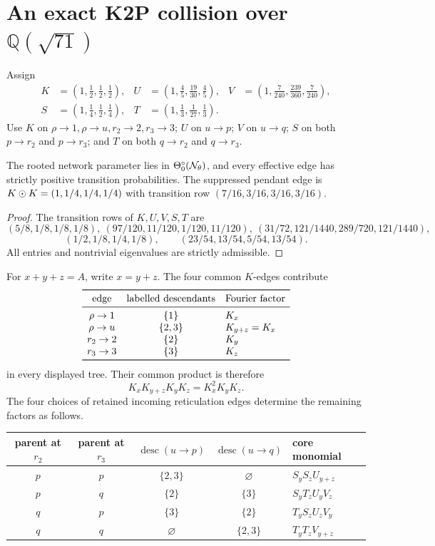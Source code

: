 \documentclass[11pt]{article}
\theoremstyle{remark}\newtheorem{remark}[theorem]{Remark}
\begin{document}
\section{An exact K2P collision over \texorpdfstring{$\mathbb Q(\sqrt{71})$}{Q(sqrt(71))}}\label{sec:k2p-simple}
Assign
\begin{equation}\label{eq:k2p-vectors}
\begin{aligned}
K&=(1,\tfrac12,\tfrac12,\tfrac12),&U&=(1,\tfrac45,\tfrac{19}{30},\tfrac45),&V&=(1,\tfrac7{240},\tfrac{239}{360},\tfrac7{240}),\\
S&=(1,\tfrac14,\tfrac12,\tfrac14),&T&=(1,\tfrac13,\tfrac1{27},\tfrac13).
\end{aligned}
\end{equation}
Use $K$ on $\rho\to1,\rho\to u,r_2\to2,r_3\to3$; $U$ on $u\to p$; $V$ on $u\to q$; $S$ on both $p\to r_2$ and $p\to r_3$; and $T$ on both $q\to r_2$ and $q\to r_3$.
\begin{lemma}\label{lem:k2p-adm}
The rooted network parameter lies in $\Theta_0^\circ(\mathcal N_\theta)$, and every effective edge has strictly positive transition probabilities. The suppressed pendant edge is $K\mathbin{\odot} K=(1,1/4,1/4,1/4)$ with transition row $(7/16,3/16,3/16,3/16)$.
\end{lemma}
\begin{proof}
The transition rows of $K,U,V,S,T$ are
\[
(5/8,1/8,1/8,1/8),\ (97/120,11/120,1/120,11/120),\ (31/72,121/1440,289/720,121/1440),
\]
\[
(1/2,1/8,1/4,1/8),\qquad(23/54,13/54,5/54,13/54).
\]
All entries and nontrivial eigenvalues are strictly admissible.
\end{proof}
For $x+y+z=A$, write $x=y+z$. The four common $K$-edges contribute
\[
\begin{array}{ccl}
\toprule
\text{edge}&\text{labelled descendants}&\text{Fourier factor}\\
\midrule
\rho\to1&\{1\}&K_x\\
\rho\to u&\{2,3\}&K_{y+z}=K_x\\
r_2\to2&\{2\}&K_y\\
r_3\to3&\{3\}&K_z\\
\bottomrule
\end{array}
\]
in every displayed tree. Their common product is therefore
\[
K_xK_{y+z}K_yK_z=K_x^2K_yK_z.
\]
The four choices of retained incoming reticulation edges determine the remaining factors as follows.
\begin{center}
\small
\begin{tabularx}{\textwidth}{@{}cccc>{\raggedright\arraybackslash}X@{}}
\toprule
\shortstack{parent\\at $r_2$}&\shortstack{parent\\at $r_3$}&$\operatorname{desc}(u\to p)$&$\operatorname{desc}(u\to q)$&core monomial\\
\midrule
$p$&$p$&$\{2,3\}$&$\varnothing$&$S_yS_zU_{y+z}$\\
$p$&$q$&$\{2\}$&$\{3\}$&$S_yT_zU_yV_z$\\
$q$&$p$&$\{3\}$&$\{2\}$&$T_yS_zU_zV_y$\\
$q$&$q$&$\varnothing$&$\{2,3\}$&$T_yT_zV_{y+z}$\\
\bottomrule
\end{tabularx}
\end{center}
\end{document}
